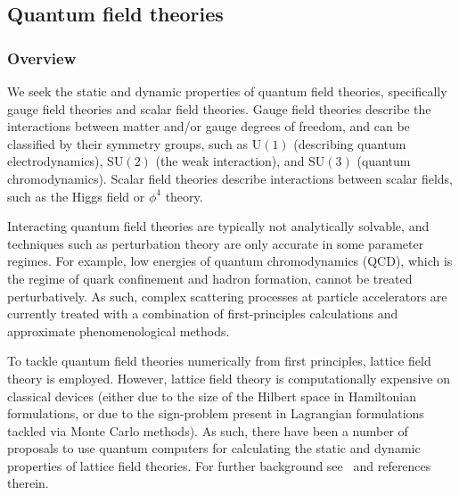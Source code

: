 \begin{refsection}

\subsection{Quantum field theories}\label{appl:QuantumFieldTheories}

\subsubsection*{Overview}
We seek the static and dynamic properties of quantum field theories, specifically gauge field theories and scalar field theories. Gauge field theories describe the interactions between matter and/or gauge degrees of freedom, and can be classified by their symmetry groups, such as U$(1)$ (describing quantum electrodynamics), SU$(2)$ (the weak interaction), and SU$(3)$ (quantum chromodynamics). Scalar field theories describe interactions between scalar fields, such as the Higgs field or $\phi^4$ theory. 

Interacting quantum field theories are typically not analytically solvable, and techniques such as perturbation theory are only accurate in some parameter regimes. For example, low energies of quantum chromodynamics (QCD), which is the regime of quark confinement and hadron formation, cannot be treated perturbatively. As such, complex scattering processes at particle accelerators are currently treated with a combination of first-principles calculations and approximate phenomenological methods.

To tackle quantum field theories numerically from first principles, lattice field theory is employed. However, lattice field theory is computationally expensive on classical devices (either due to the size of the Hilbert space in Hamiltonian formulations, or due to the sign-problem present in Lagrangian formulations tackled via Monte Carlo methods). As such, there have been a number of proposals to use quantum computers for calculating the static and dynamic properties of lattice field theories. For further background see~\cite{preskill2018SimQFT, davoudi2022quantumHEP, meurice2022TensorLatticeFieldTheory} and references therein. 





\end{refsection}
